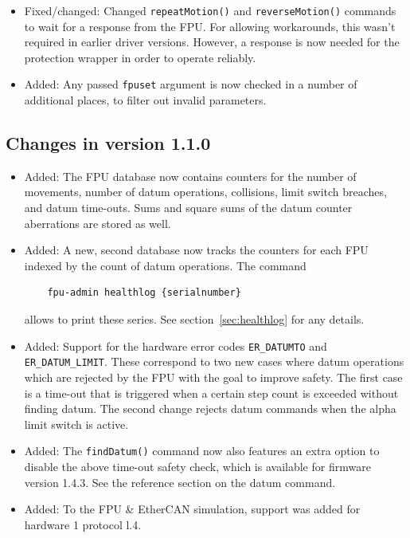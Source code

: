 \documentclass[11pt,a4paper]{scrartcl}
\begin{document}
\begin{itemize}
\item Fixed/changed: Changed \texttt{repeatMotion()} and
  \texttt{reverseMotion()} commands to wait for a response from the
  FPU. For allowing workarounds, this wasn't required in earlier
  driver versions.  However, a response is now needed for the
  protection wrapper in order to operate reliably.

\item Added: Any passed \texttt{fpuset} argument is now checked in a
  number of additional places, to filter out invalid parameters.
\end{itemize}

\subsection*{Changes in version 1.1.0}
\begin{itemize}
\item Added: The FPU database now contains counters for the number of
  movements, number of datum operations, collisions, limit switch
  breaches, and datum time-outs. Sums and square sums of the datum
  counter aberrations are stored as well.

\item Added: A new, second database now tracks the counters for each
  FPU indexed by the count of datum operations. The command
  \begin{verbatim}
    fpu-admin healthlog {serialnumber}
  \end{verbatim}
  allows to print these series. See section~\ref{sec:healthlog} for
  any details.

\item Added: Support for the hardware error codes \texttt{ER\_DATUMTO}
  and \texttt{ER\_DATUM\_LIMIT}. These correspond to two new cases
  where datum operations which are rejected by the FPU with the goal
  to improve safety. The first case is a time-out that is triggered
  when a certain step count is exceeded without finding datum.  The
  second change rejects datum commands when the alpha limit switch is
  active.

\item Added: The \texttt{findDatum()} command now also features an
  extra option to disable the above time-out safety check, which is
  available for firmware version 1.4.3. See the reference section on
  the datum command.
  
\item Added: To the FPU \& EtherCAN simulation, support
  was added for hardware 1 protocol l.4. 
  

\end{itemize}
\end{document}
